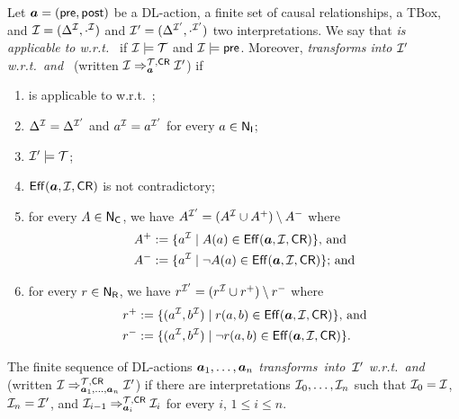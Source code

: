 \begin{definition}\label{def:action-semantics}
    Let $\boldsymbol a=(\mathsf{pre},\mathsf{post})$ be a DL-action, \CR a finite set of
    causal relationships, \Tmc a TBox, and $\mathcal{I}=(\Delta^\mathcal{I},\cdot^\mathcal{I})$ and
    $\mathcal{I}'=(\Delta^{\mathcal{I}'},\cdot^{\mathcal{I}'})$ two interpretations.  We say that
    \emph{\abf is applicable to \Imc w.r.t.~\Tmc} if $\mathcal{I}\models\mathcal{T}$ and
    $\mathcal{I}\models\mathsf{pre}$.  Moreover, \emph{\abf transforms \Imc into $\mathcal{I}'$
    w.r.t.~\Tmc and~\CR} (written $\mathcal{I}\Rightarrow_{\boldsymbol a}^{\mathcal{T},\mathsf{CR}}\mathcal{I}'$) if
    \begin{enumerate}
        \item\label{enum:condition-applicable}
            \abf is applicable to \Imc w.r.t.~\Tmc;
        \item $\Delta^\mathcal{I}=\Delta^{\mathcal{I}'}$ and $a^\mathcal{I}=a^{\mathcal{I}'}$ for every
            $a\in\mathsf{N_I}$;
        \item $\mathcal{I}'\models\mathcal{T}$;
        \item\label{enum:condition-not-contradictory}
            $\operatorname{\mathsf{Eff}}(\boldsymbol a,\mathcal{I},\mathsf{CR})$ is not contradictory;
        \item for every $A\in\mathsf{N_C}$, we have $A^{\mathcal{I}'}=(A^\mathcal{I}\cup A^+)\setminus
            A^-$ where
            \begin{align*}
                A^+ &:=\{a^\mathcal{I}\mid A(a)\in\operatorname{\mathsf{Eff}}(\boldsymbol a,\mathcal{I},\mathsf{CR})\}\text{, and}\\
                A^- &:=\{a^\mathcal{I}\mid\lnot A(a)\in\operatorname{\mathsf{Eff}}(\boldsymbol a,\mathcal{I},\mathsf{CR})\}\text{; and}
            \end{align*}
        \item for every $r\in\mathsf{N_R}$, we have $r^{\mathcal{I}'}=(r^\mathcal{I}\cup r^+)\setminus
            r^-$ where
            \begin{align*}
                r^+ &:=\{(a^\mathcal{I},b^\mathcal{I})\mid r(a,b)\in\operatorname{\mathsf{Eff}}(\boldsymbol a,\mathcal{I},\mathsf{CR})\}\text{, and}\\
                r^- &:=\{(a^\mathcal{I},b^\mathcal{I})\mid\lnot r(a,b)\in\operatorname{\mathsf{Eff}}(\boldsymbol a,\mathcal{I},\mathsf{CR})\}.
            \end{align*}
    \end{enumerate}
    The finite sequence of DL-actions \emph{$\boldsymbol a_1,\dots,\boldsymbol a_n$
    transforms~\Imc into~$\mathcal{I}'$ w.r.t.~\Tmc and~\CR} (written
    $\mathcal{I}\Rightarrow_{\boldsymbol a_1,\dots,\boldsymbol a_n}^{\mathcal{T},\mathsf{CR}}\mathcal{I}'$) if there are
    interpretations $\mathcal{I}_0,\dots,\mathcal{I}_n$ such that $\mathcal{I}_0=\mathcal{I}$,
    $\mathcal{I}_n=\mathcal{I}'$, and $\mathcal{I}_{i-1}\Rightarrow_{\boldsymbol a_i}^{\mathcal{T},\mathsf{CR}}\mathcal{I}_i$ for
    every $i$, $1\le i\le n$.
\end{definition}

